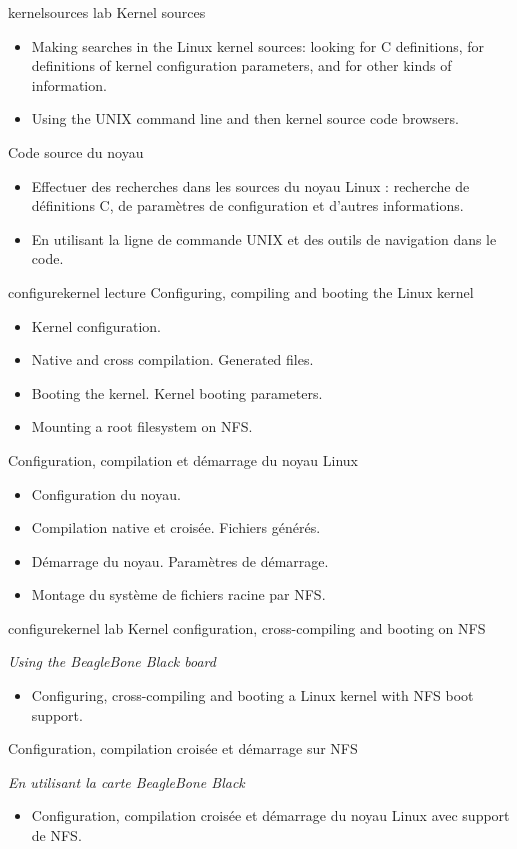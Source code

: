 {kernelsources}
{lab}
{Kernel sources}
{
  \begin{itemize}
  \item Making searches in the Linux kernel sources: looking for C
    definitions, for definitions of kernel configuration parameters,
    and for other kinds of information.
  \item Using the UNIX command line and then kernel source code
    browsers.
 \end{itemize}
}
{Code source du noyau}
{
  \begin{itemize}
  \item Effectuer des recherches dans les sources du noyau Linux :
    recherche de définitions C, de paramètres de configuration et d'autres
    informations.
  \item En utilisant la ligne de commande UNIX et des outils de
    navigation dans le code.
 \end{itemize}
}
{configurekernel}
{lecture}
{Configuring, compiling and booting the Linux kernel}
{
  \begin{itemize}
  \item Kernel configuration.
  \item Native and cross compilation. Generated files.
  \item Booting the kernel. Kernel booting parameters.
  \item Mounting a root filesystem on NFS.
  \end{itemize}
}
{Configuration, compilation et démarrage du noyau Linux}
{
  \begin{itemize}
  \item Configuration du noyau.
  \item Compilation native et croisée. Fichiers générés.
  \item Démarrage du noyau. Paramètres de démarrage.
  \item Montage du système de fichiers racine par NFS.
  \end{itemize}
}
{configurekernel}
{lab}
{Kernel configuration, cross-compiling and booting on NFS}
{
  {\em Using the BeagleBone Black board}
  \begin{itemize}
  \item Configuring, cross-compiling and booting a Linux kernel with
    NFS boot support.
  \end{itemize}
}
{Configuration, compilation croisée et démarrage sur NFS}
{
  {\em En utilisant la carte BeagleBone Black}
  \begin{itemize}
  \item Configuration, compilation croisée et démarrage du noyau Linux
    avec support de NFS.
  \end{itemize}
}

